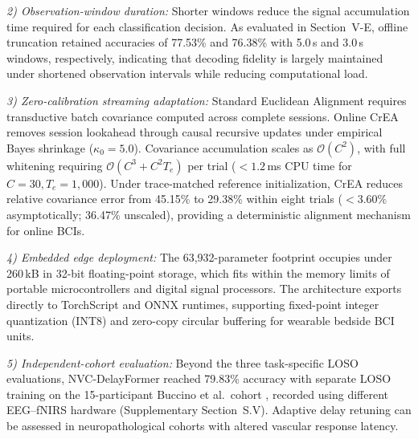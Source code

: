 \documentclass[journal]{IEEEtran}
\begin{document}
\textit{2) Observation-window duration:} Shorter windows reduce the signal accumulation time required for each classification decision. As evaluated in Section~V-E, offline truncation retained accuracies of 77.53\% and 76.38\% with 5.0\,s and 3.0\,s windows, respectively, indicating that decoding fidelity is largely maintained under shortened observation intervals while reducing computational load.

\textit{3) Zero-calibration streaming adaptation:} Standard Euclidean Alignment requires transductive batch covariance computed across complete sessions. Online CrEA removes session lookahead through causal recursive updates under empirical Bayes shrinkage ($\kappa_0 = 5.0$). Covariance accumulation scales as $\mathcal{O}(C^2)$, with full whitening requiring $\mathcal{O}(C^3 + C^2 T_e)$ per trial ($<1.2$\,ms CPU time for $C=30, T_e=1,000$). Under trace-matched reference initialization, CrEA reduces relative covariance error from 45.15\% to 29.38\% within eight trials ($<3.60\%$ asymptotically; 36.47\% unscaled), providing a deterministic alignment mechanism for online BCIs.

\textit{4) Embedded edge deployment:} The 63,932-parameter footprint occupies under 260\,kB in 32-bit floating-point storage, which fits within the memory limits of portable microcontrollers and digital signal processors. The architecture exports directly to TorchScript and ONNX runtimes, supporting fixed-point integer quantization (INT8) and zero-copy circular buffering for wearable bedside BCI units.

\textit{5) Independent-cohort evaluation:} Beyond the three task-specific LOSO evaluations, NVC-DelayFormer reached 79.83\% accuracy with separate LOSO training on the 15-participant Buccino et al.\ cohort \cite{buccino2016hybrid}, recorded using different EEG--fNIRS hardware (Supplementary Section~S.V). Adaptive delay retuning can be assessed in neuropathological cohorts with altered vascular response latency.
\end{document}
